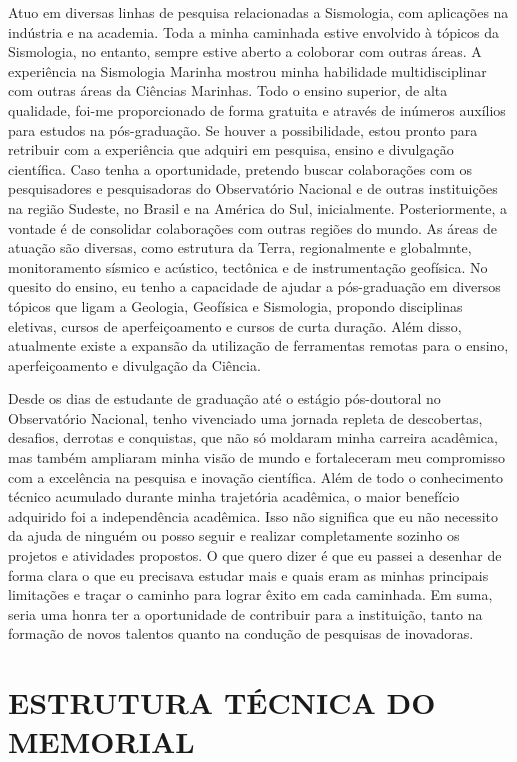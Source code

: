 \documentclass[10pt,a4paper,oneside]{book}
\begin{document}
Atuo em diversas linhas de pesquisa relacionadas a Sismologia, com aplicações na indústria e na academia. Toda a minha caminhada estive envolvido à tópicos da Sismologia, no entanto, sempre estive aberto a coloborar com outras áreas. A experiência na Sismologia Marinha mostrou minha habilidade multidisciplinar com outras áreas da Ciências Marinhas. Todo o ensino superior, de alta qualidade, foi-me proporcionado de forma gratuita e através de inúmeros auxílios para estudos na pós-graduação. Se houver a possibilidade, estou pronto para retribuir com a experiência que adquiri em pesquisa, ensino e divulgação científica. Caso tenha a oportunidade, pretendo buscar colaborações com os pesquisadores e pesquisadoras do Observatório Nacional e de outras instituições na região Sudeste, no Brasil e  na América do Sul, inicialmente. Posteriormente, a vontade é de consolidar colaborações com outras regiões do mundo. As áreas de atuação são diversas, como estrutura da Terra, regionalmente e globalmnte, monitoramento sísmico e acústico, tectônica e de instrumentação geofísica. No quesito do ensino, eu tenho a capacidade de ajudar a pós-graduação em diversos tópicos que ligam a Geologia, Geofísica e Sismologia, propondo disciplinas eletivas, cursos de aperfeiçoamento e cursos de curta duração. Além disso, atualmente existe a expansão da utilização de ferramentas remotas para o ensino, aperfeiçoamento e divulgação da Ciência. 

Desde os dias de estudante de graduação até o estágio pós-doutoral no Observatório Nacional, tenho vivenciado uma jornada repleta de descobertas, desafios, derrotas e conquistas, que não só moldaram minha carreira acadêmica, mas também ampliaram minha visão de mundo e fortaleceram meu compromisso com a excelência na pesquisa e inovação científica. Além de todo o conhecimento técnico acumulado durante minha trajetória acadêmica, o maior benefício adquirido foi a independência acadêmica. Isso não significa que eu não necessito da ajuda de ninguém ou posso seguir e realizar completamente sozinho os projetos e atividades propostos. O que quero dizer é que eu passei a desenhar de forma clara o que eu precisava estudar mais e quais eram as minhas principais limitações e traçar o caminho para lograr êxito em cada caminhada. Em suma, seria uma honra ter a oportunidade de contribuir para a instituição, tanto na formação de novos talentos quanto na condução de pesquisas de inovadoras.


\chapter{ESTRUTURA TÉCNICA DO MEMORIAL }
\label{cap_estrutura}
\end{document}
